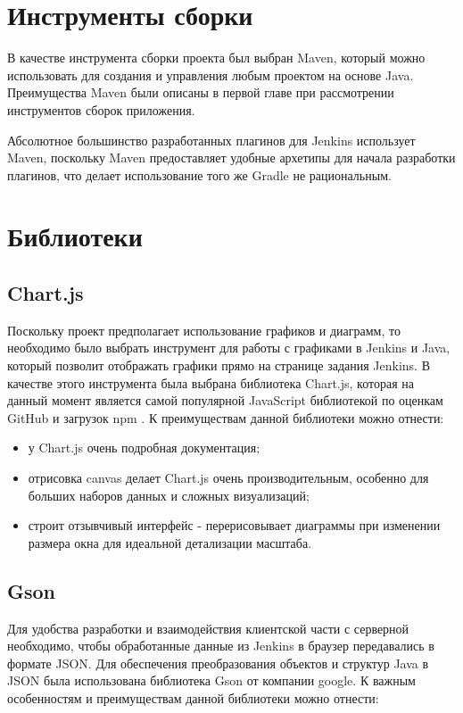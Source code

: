 \section{Инструменты сборки} \label{ch1:sec5}

В качестве инструмента сборки проекта был выбран Maven, который можно использовать для создания и управления любым проектом на основе Java. Преимущества Maven были описаны в первой главе при рассмотрении инструментов сборок приложения.

Абсолютное большинство разработанных плагинов для Jenkins использует Maven, поскольку Maven предоставляет удобные архетипы для начала разработки плагинов, что делает использование того же Gradle не рациональным.


\section{Библиотеки} \label{ch1:sec6}

\subsection{Chart.js}

Поскольку проект предполагает использование графиков и диаграмм, то необходимо было выбрать инструмент для работы с графиками в Jenkins и Java, который позволит отображать графики прямо на странице задания Jenkins. В качестве этого инструмента была выбрана библиотека Chart.js, которая на данный момент является самой популярной JavaScript библиотекой по оценкам GitHub и загрузок npm \cite{chartjs}. К преимуществам данной библиотеки можно отнести: 
\begin{itemize}
	\item у Chart.js очень подробная документация;
	\item отрисовка canvas делает Chart.js очень производительным, особенно для больших наборов данных и сложных визуализаций;
	\item строит отзывчивый интерфейс - перерисовывает диаграммы при изменении размера окна для идеальной детализации масштаба.
\end{itemize}

\subsection{Gson}

Для удобства разработки и взаимодействия клиентской части с серверной необходимо, чтобы обработанные данные из Jenkins в браузер передавались в формате JSON. Для обеспечения преобразования объектов и структур Java в JSON была использована библиотека Gson от компании google. К важным особенностям и преимуществам данной библиотеки можно отнести:

